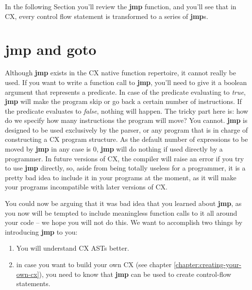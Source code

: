 \documentclass[11pt,fleqn,openany]{book} %
\begin{document}
In the following Section you'll review the \textbf{jmp} function, and you'll see that in CX, every control flow statement is transformed to a series of \textbf{jmp}s.

\section{jmp and goto}


Although \textbf{jmp} exists in the CX native function repertoire, it cannot really be used. If you want to write a function call to \textbf{jmp}, you'll need to give it a boolean argument that represents a predicate. In case of the predicate evaluating to \emph{true}, \textbf{jmp} will make the program skip or go back a certain number of instructions. If the predicate evaluates to \emph{false}, nothing will happen. The tricky part here is: how do we specify how many instructions the program will move? You cannot. \textbf{jmp} is designed to be used exclusively by the parser, or any program that is in charge of constructing a CX program structure. As the default number of expressions to be moved by \textbf{jmp} in any case is 0, \textbf{jmp} will do nothing if used directly by a programmer. In future versions of CX, the compiler will raise an error if you try to use \textbf{jmp} directly, so, aside from being totally useless for a programmer, it is a pretty bad idea to include it in your programs at the moment, as it will make your programs incompatible with later versions of CX.

You could now be arguing that it was bad idea that you learned about \textbf{jmp}, as you now will be tempted to include meaningless function calls to it all around your code -- we hope you will not do this. We want to accomplish two things by introducing \textbf{jmp} to you:
\begin{enumerate}
    \item You will understand CX ASTs better.
    \item in case you want to build your own CX (see chapter \ref{chapter:creating-your-own-cx}), you need to know that \textbf{jmp} can be used to create control-flow statements.
\end{enumerate}
\end{document}
